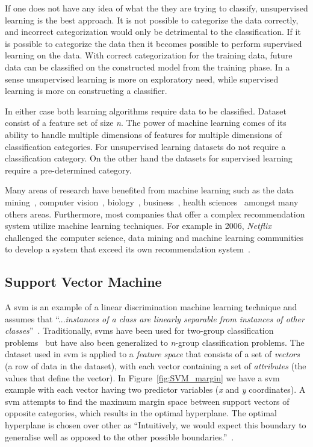 If one does not have any idea of what the they are trying to classify, unsupervised learning is the best approach. It is not possible to categorize the data correctly, and incorrect categorization would only be detrimental to the classification. If it is possible to categorize the data then it becomes possible to perform supervised learning on the data. With correct categorization for the training data, future data can be classified on the constructed model from the training phase. In a sense unsupervised learning is more on exploratory need, while supervised learning is more on constructing a classifier.

In either case both learning algorithms require data to be classified. Dataset consist of a feature set of size \emph{n}. The power of machine learning comes of its ability to handle multiple dimensions of features for multiple dimensions of classification categories. For unsupervised learning datasets do not require a classification category. On the other hand the datasets for supervised learning require a pre-determined category.

Many areas of research have benefited from machine learning such as the data mining~\cite{WFH11}, computer vision~\cite{Her03}, biology~\cite{OLP08}, business~\cite{Her00}, health sciences~\cite{Kon01} amongst many others areas. Furthermore, most companies that offer a complex recommendation system utilize machine learning techniques. For example in 2006, \emph{Netflix} challenged the computer science, data mining and machine learning communities to develop a system that exceed its own recommendation system~\cite{BL07}.


\subsection{Support Vector Machine}
\label{subsec:background_support_vector_machine}
A \gls{svm} is an example of a linear discrimination machine learning technique and assumes that ``...\emph{instances of a class are linearly separable from instances of other classes}''~\cite{ALP04}. Traditionally, \gls{svm}s have been used for two-group classification problems~\cite{CV95} but have also been generalized to \emph{n}-group classification problems. The dataset used in \gls{svm} is applied to a \emph{feature space} that consists of a set of \emph{vectors} (a row of data in the dataset), with each vector containing a set of \emph{attributes} (the values that define the vector). In Figure~\ref{fig:SVM_margin} we have a \gls{svm} example with each vector having two predictor variables (\emph{x} and \emph{y} coordinates). A \gls{svm} attempts to find the maximum margin space between support vectors of opposite categories, which results in the optimal hyperplane. The optimal hyperplane is chosen over other as ``Intuitively, we would expect this boundary to generalise well as opposed to the other possible boundaries.''~\cite{Gun98}.


